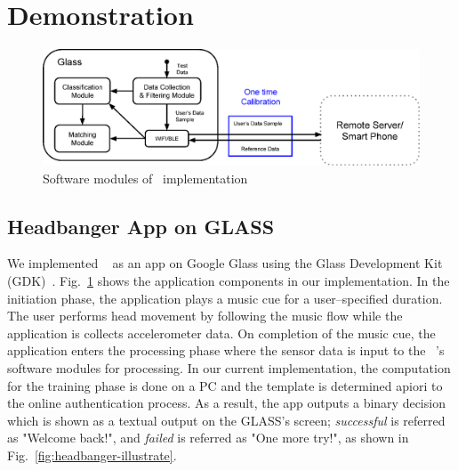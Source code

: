 \section{Demonstration}\label{sec:demo}


\begin{figure}[t]
\centering
\includegraphics [width=\columnwidth]{pic/software_arch.eps}
\caption{Software modules of \systemname~implementation}
\label{fig:glass-softwarearch}
\end{figure}


\subsection{Headbanger App on GLASS}
We implemented \systemname~ as an app on Google Glass using the Glass Development Kit (GDK)~\cite{gdk}. Fig.~\ref{fig:glass-softwarearch} shows the application components in our implementation. In the initiation phase, the application plays a music cue for a user--specified duration. The user performs head movement by following the music flow while the application is collects accelerometer data. On completion of the music cue, the application enters the processing phase where the sensor data is input to the \systemname~'s software modules for processing. In our current implementation, the computation for the training phase is done on a PC and the template is determined apiori to the online authentication process.
As a result, the app outputs a binary decision which is shown as a textual output on the GLASS's screen; {\em successful} is referred as "Welcome back!", and {\em failed} is referred as "One more try!", as shown in Fig.~\ref{fig:headbanger-illustrate}.


